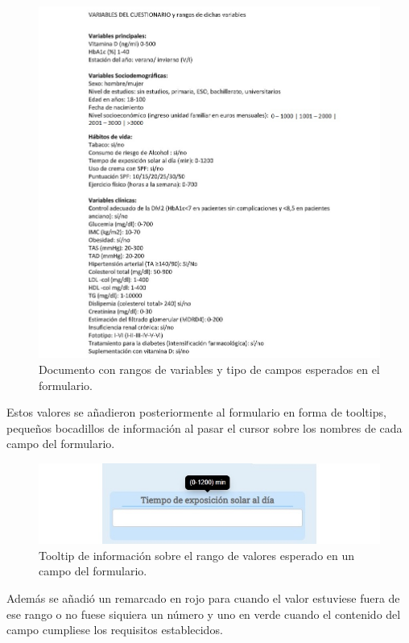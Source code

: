 \begin{figure}[h]
    \centering
     \includegraphics[width=1\textwidth]{images/rangosVariables.jpg}
    \caption{Documento con rangos de variables y tipo de campos esperados en el formulario.}
\end{figure}
\newpage

Estos valores se añadieron posteriormente al formulario en forma de tooltips, pequeños bocadillos de información al pasar el cursor sobre los nombres de cada campo del formulario.

\begin{figure}[h]
    \centering
     \includegraphics[width=1\textwidth]{images/tooltip.jpg}
    \caption{Tooltip de información sobre el rango de valores esperado en un campo del formulario.}
\end{figure}

Además se añadió un remarcado en rojo para cuando el valor estuviese fuera de ese rango o no fuese siquiera un número y uno en verde cuando el contenido del campo cumpliese los requisitos establecidos.

